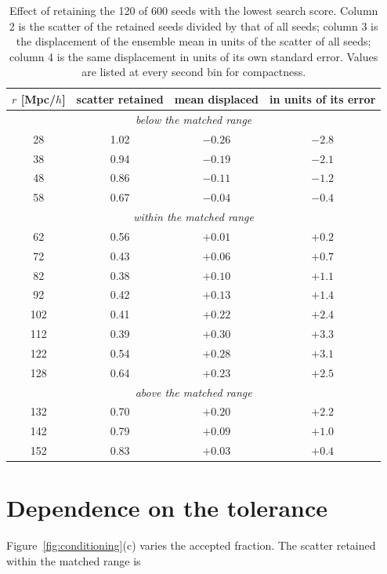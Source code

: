 \documentclass[12pt]{article}
\begin{document}
\begin{table}[htbp]
  \centering
  \caption{Effect of retaining the 120 of 600 seeds with the lowest search
    score.  Column 2 is the scatter of the retained seeds divided by that of
    all seeds; column 3 is the displacement of the ensemble mean in units of
    the scatter of all seeds; column 4 is the same displacement in units of its
    own standard error.  Values are listed at every second bin for compactness.}
  \label{tab:ratios}
  \begin{tabular}{cccc}
    \toprule
    $r$ [Mpc/$h$] & scatter retained & mean displaced & in units of its error\\
    \midrule
    \multicolumn{4}{c}{\emph{below the matched range}}\\
     28 & 1.02 & $-0.26$ & $-2.8$\\
     38 & 0.94 & $-0.19$ & $-2.1$\\
     48 & 0.86 & $-0.11$ & $-1.2$\\
     58 & 0.67 & $-0.04$ & $-0.4$\\
    \midrule
    \multicolumn{4}{c}{\emph{within the matched range}}\\
     62 & 0.56 & $+0.01$ & $+0.2$\\
     72 & 0.43 & $+0.06$ & $+0.7$\\
     82 & 0.38 & $+0.10$ & $+1.1$\\
     92 & 0.42 & $+0.13$ & $+1.4$\\
    102 & 0.41 & $+0.22$ & $+2.4$\\
    112 & 0.39 & $+0.30$ & $+3.3$\\
    122 & 0.54 & $+0.28$ & $+3.1$\\
    128 & 0.64 & $+0.23$ & $+2.5$\\
    \midrule
    \multicolumn{4}{c}{\emph{above the matched range}}\\
    132 & 0.70 & $+0.20$ & $+2.2$\\
    142 & 0.79 & $+0.09$ & $+1.0$\\
    152 & 0.83 & $+0.03$ & $+0.4$\\
    \bottomrule
  \end{tabular}
\end{table}

\section{Dependence on the tolerance}\label{sec:tolerance}

Figure~\ref{fig:conditioning}(c) varies the accepted fraction.  The scatter
retained within the matched range is
\end{document}
